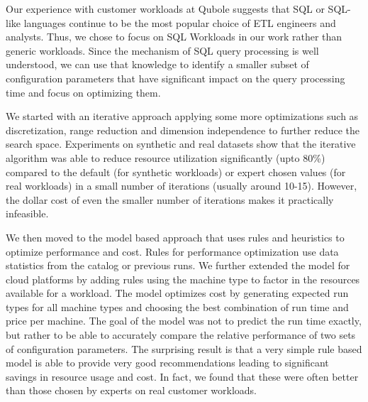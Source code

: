 Our experience with customer workloads at Qubole suggests that SQL or SQL-like languages continue to be the most popular choice of ETL engineers and analysts. Thus, we chose to focus on SQL Workloads in our work rather than generic workloads. Since the mechanism of SQL query processing is well understood, we can use that knowledge to identify a smaller subset of configuration parameters that have significant impact on the query processing time and focus on optimizing them. 


We started with an iterative approach applying some more optimizations such as discretization, range reduction and dimension independence to further reduce the search space. Experiments on synthetic and real datasets show that the iterative algorithm was able to reduce resource utilization significantly (upto 80\%) compared to the default (for synthetic workloads) or expert chosen values (for real workloads) in a small number of iterations (usually around 10-15). However, the dollar cost of even the smaller number of iterations makes it practically infeasible.

We then moved to the model based approach that uses rules and heuristics to optimize performance and cost. Rules for performance optimization use data statistics from the catalog or previous runs. We further extended the model for cloud platforms by adding rules using the machine type to factor in the resources available for a workload. The model optimizes cost by generating expected run types for all machine types and choosing the best combination of run time and price per machine. The goal of the model was not to predict the run time exactly, but rather to be able to accurately compare the relative performance of two sets of configuration parameters. The surprising result is that a very simple rule based model is able to provide very good recommendations leading to significant savings in resource usage and cost. In fact, we found that these were often better than those chosen by experts on real customer workloads.



